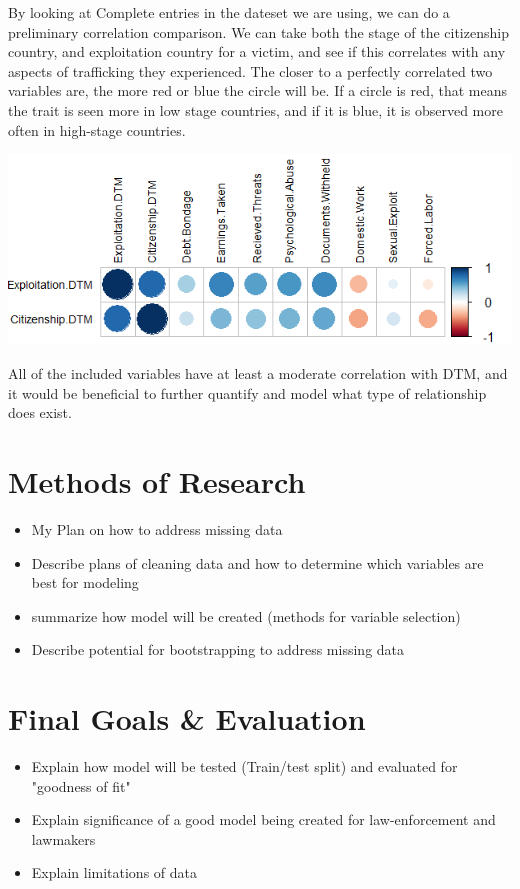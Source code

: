 \documentclass{article} %
\begin{document}
By looking at Complete entries in the dateset we are using, we can do a preliminary correlation comparison. We can take both the stage of the citizenship country, and exploitation country for a victim, and see if this correlates with any aspects of trafficking they experienced. The closer to a perfectly correlated two variables are, the more red or blue the circle will be. If a circle is red, that means the trait is seen more in low stage countries, and if it is blue, it is observed more often in high-stage countries.

\includegraphics{Corrplot} \bigskip

All of the included variables have at least a moderate correlation with DTM, and it would be beneficial to further quantify and model what type of relationship does exist.

\section{Methods of Research}

\begin{itemize}
	\item My Plan on how to address missing data
	\item Describe plans of cleaning data and how to determine which variables are best for modeling
	\item summarize how model will be created (methods for variable selection)
	\item Describe potential for bootstrapping to address missing data
\end{itemize}

\section{Final Goals \& Evaluation}

\begin{itemize}
	\item Explain how model will be tested (Train/test split) and evaluated for "goodness of fit"
	\item Explain significance of a good model being created for law-enforcement and lawmakers
	\item Explain limitations of data
\end{itemize}
\end{document}
